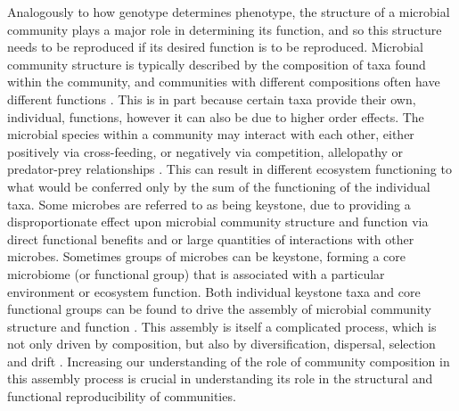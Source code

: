 \documentclass[11pt]{article}
\begin{document}
Analogously to how genotype determines phenotype, the structure of a microbial community plays a major role in determining its function, and so this structure needs to be reproduced if its desired function is to be reproduced. Microbial community structure is typically described by the composition of taxa found within the community, and communities with different compositions often have different functions \citep{Strickland2009-go}. This is in part because certain taxa provide their own, individual, functions, however it can also be due to higher order effects. The microbial species within a community may interact with each other, either positively via cross-feeding, or negatively via competition, allelopathy or predator-prey relationships \citep{Fuhrman2009}. This can result in different ecosystem functioning to what would be conferred only by the sum of the functioning of the individual taxa. Some microbes are referred to as being keystone, due to providing a disproportionate effect upon microbial community structure and function via direct functional benefits and or large quantities of interactions with other microbes. Sometimes groups of microbes can be keystone, forming a core microbiome (or functional group) that is associated with a particular environment or ecosystem function. Both individual keystone taxa and core functional groups can be found to drive the assembly of microbial community structure and function \citep{Banerjee2018, Toju2018}. This assembly is itself a complicated process, which is not only driven by composition, but also by diversification, dispersal, selection and drift \citep{Nemergut2013-lo}. Increasing our understanding of the role of community composition in this assembly process is crucial in understanding its role in the structural and functional reproducibility of communities.
\end{document}
